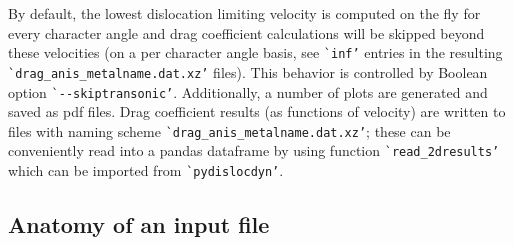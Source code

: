 \documentclass[11pt,letterpaper,oneside,pdftex]{article}
\begin{document}
By default, the lowest dislocation limiting velocity is computed on the fly for every character angle and drag coefficient calculations will be skipped beyond these velocities (on a per character angle basis, see \verb|`inf’| entries in the resulting \verb|`drag_anis_metalname.dat.xz’| files).
This behavior is controlled by Boolean option \verb|`--skiptransonic’|.
Additionally, a number of plots are generated and saved as pdf files.
Drag coefficient results (as functions of velocity) are written to files with naming scheme \verb|`drag_anis_metalname.dat.xz’|;
these can be conveniently read into a pandas dataframe by using function \verb|`read_2dresults’| which can be imported from \verb|`pydislocdyn’|.




\subsection{Anatomy of an input file}
\label{sec:inputfiles}
\end{document}
